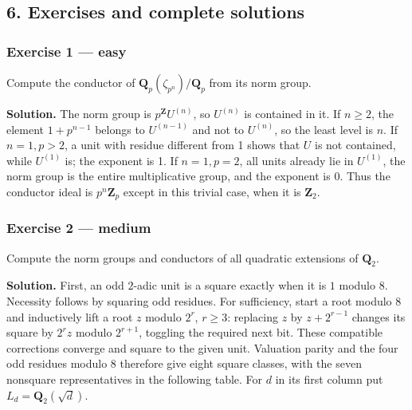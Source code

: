 \documentclass[11pt,a4paper]{article}
\begin{document}
\subsection{6. Exercises and complete
solutions}\label{exercises-and-complete-solutions}

\subsubsection{Exercise 1 --- easy}\label{exercise-1-easy}

Compute the conductor of \(\mathbf Q_p(\zeta_{p^n})/\mathbf Q_p\) from
its norm group.

\textbf{Solution.} The norm group is \(p^{\mathbf Z}U^{(n)}\), so
\(U^{(n)}\) is contained in it. If \(n\geq2\), the element \(1+p^{n-1}\)
belongs to \(U^{(n-1)}\) and not to \(U^{(n)}\), so the least level is
\(n\). If \(n=1,p>2\), a unit with residue different from 1 shows that
\(U\) is not contained, while \(U^{(1)}\) is; the exponent is 1. If
\(n=1,p=2\), all units already lie in \(U^{(1)}\), the norm group is the
entire multiplicative group, and the exponent is 0. Thus the conductor
ideal is \(p^n\mathbf Z_p\) except in this trivial case, when it is
\(\mathbf Z_2\).

\subsubsection{Exercise 2 --- medium}\label{exercise-2-medium}

Compute the norm groups and conductors of all quadratic extensions of
\(\mathbf Q_2\).

\textbf{Solution.} First, an odd \(2\)-adic unit is a square exactly
when it is \(1\) modulo 8. Necessity follows by squaring odd residues.
For sufficiency, start a root modulo 8 and inductively lift a root \(z\)
modulo \(2^r\), \(r\geq3\): replacing \(z\) by \(z+2^{r-1}\) changes its
square by \(2^rz\) modulo \(2^{r+1}\), toggling the required next bit.
These compatible corrections converge and square to the given unit.
Valuation parity and the four odd residues modulo 8 therefore give eight
square classes, with the seven nonsquare representatives in the
following table. For \(d\) in its first column put
\(L_d=\mathbf Q_2(\sqrt d)\).
\end{document}
